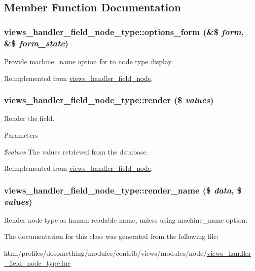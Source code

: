 \subsection{Member Function Documentation}
\hypertarget{classviews__handler__field__node__type_a0152124a453b32265e512bace19d6de4}{
\subsubsection[{options\_\-form}]{\setlength{\rightskip}{0pt plus 5cm}views\_\-handler\_\-field\_\-node\_\-type::options\_\-form (\&\$ {\em form}, \/  \&\$ {\em form\_\-state})}}
\label{classviews__handler__field__node__type_a0152124a453b32265e512bace19d6de4}
Provide machine\_\-name option for to node type display. 

Reimplemented from \hyperlink{classviews__handler__field__node_af3d8a04be282a20079ea4fb82e768910}{views\_\-handler\_\-field\_\-node}.\hypertarget{classviews__handler__field__node__type_a13c9a516cca49870a1603fdd26071851}{
\subsubsection[{render}]{\setlength{\rightskip}{0pt plus 5cm}views\_\-handler\_\-field\_\-node\_\-type::render (\$ {\em values})}}
\label{classviews__handler__field__node__type_a13c9a516cca49870a1603fdd26071851}
Render the field.


\begin{DoxyParams}{Parameters}
\item[{\em \$values}]The values retrieved from the database. \end{DoxyParams}


Reimplemented from \hyperlink{classviews__handler__field__node_afe7681e1188ad74ce9b604ad3ba864c0}{views\_\-handler\_\-field\_\-node}.\hypertarget{classviews__handler__field__node__type_a16f19e2f652fd883b10a568eba122d5b}{
\subsubsection[{render\_\-name}]{\setlength{\rightskip}{0pt plus 5cm}views\_\-handler\_\-field\_\-node\_\-type::render\_\-name (\$ {\em data}, \/  \$ {\em values})}}
\label{classviews__handler__field__node__type_a16f19e2f652fd883b10a568eba122d5b}
Render node type as human readable name, unless using machine\_\-name option. 

The documentation for this class was generated from the following file:\begin{DoxyCompactItemize}
\item 
html/profiles/dosomething/modules/contrib/views/modules/node/\hyperlink{views__handler__field__node__type_8inc}{views\_\-handler\_\-field\_\-node\_\-type.inc}\end{DoxyCompactItemize}
